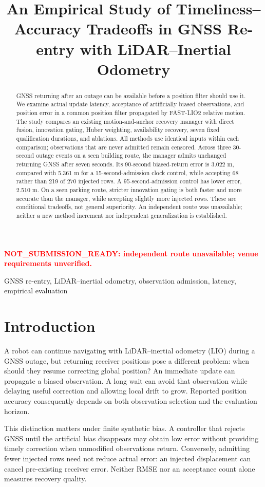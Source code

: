 \documentclass[conference]{IEEEtran}
\title{An Empirical Study of Timeliness--Accuracy Tradeoffs in GNSS Re-entry with LiDAR--Inertial Odometry}
\author{\IEEEauthorblockN{Internal author-review draft: authors and affiliations unassigned}}
\newcommand{\reviewmark}{\textcolor{red}{\textbf{NOT\_SUBMISSION\_READY: independent route unavailable; venue requirements unverified.}}}
\begin{document}
\maketitle
\begin{center}\small\reviewmark\end{center}
\begin{abstract}
GNSS returning after an outage can be available before a position filter should use it. We examine actual update latency, acceptance of artificially biased observations, and position error in a common position filter propagated by FAST-LIO2 relative motion. The study compares an existing motion-and-anchor recovery manager with direct fusion, innovation gating, Huber weighting, availability recovery, seven fixed qualification durations, and ablations. All methods use identical inputs within each comparison; observations that are never admitted remain censored. Across three 30-second outage events on a seen building route, the manager admits unchanged returning GNSS after seven seconds. Its 90-second biased-return error is 3.022 m, compared with 5.361 m for a 15-second-admission clock control, while accepting 68 rather than 219 of 270 injected rows. A 95-second-admission control has lower error, 2.510 m. On a seen parking route, stricter innovation gating is both faster and more accurate than the manager, while accepting slightly more injected rows. These are conditional tradeoffs, not general superiority. An independent route was unavailable; neither a new method increment nor independent generalization is established.
\end{abstract}
\begin{IEEEkeywords}GNSS re-entry, LiDAR--inertial odometry, observation admission, latency, empirical evaluation\end{IEEEkeywords}

\section{Introduction}
A robot can continue navigating with LiDAR--inertial odometry (LIO) during a GNSS outage, but returning receiver positions pose a different problem: when should they resume correcting global position? An immediate update can propagate a biased observation. A long wait can avoid that observation while delaying useful correction and allowing local drift to grow. Reported position accuracy consequently depends on both observation selection and the evaluation horizon.

This distinction matters under finite synthetic bias. A controller that rejects GNSS until the artificial bias disappears may obtain low error without providing timely correction when unmodified observations return. Conversely, admitting fewer injected rows need not reduce actual error: an injected displacement can cancel pre-existing receiver error. Neither RMSE nor an acceptance count alone measures recovery quality.
\end{document}
